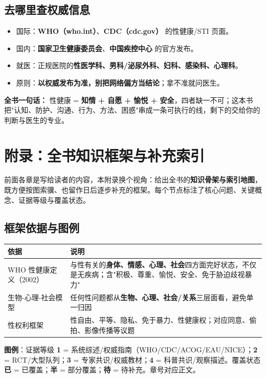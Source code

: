 \section{去哪里查权威信息}

\begin{itemize}[leftmargin=2em,itemsep=0.3em]
  \item 国际：\textbf{WHO（who.int）}、\textbf{CDC（cdc.gov）} 的性健康/STI 页面。
  \item 国内：\textbf{国家卫生健康委员会}、\textbf{中国疾控中心} 的官方发布。
  \item 就医：正规医院的\textbf{性医学科、男科/泌尿外科、妇科、感染科、心理科}。
  \item 原则：\textbf{以权威发布为准，别把网络偏方当结论}；拿不准就问医生。
\end{itemize}

\vspace{1em}
\noindent\textbf{全书一句话：} 性健康 = \textbf{知情 + 自愿 + 愉悦 + 安全}，四者缺一不可；这本书把"认知、防护、沟通、行为、方法、困惑"串成一条可执行的线，剩下的交给你的判断与医生的专业。

\chapter{附录：全书知识框架与补充索引}

前面各章是写给读者的内容，本附录换个视角：给出全书的\textbf{知识骨架与索引地图}，既方便按图索骥、也留作日后逐步补充的框架。每个节点标注了核心问题、关键概念、证据等级与覆盖状态。

\section{框架依据与图例}

\begin{tabularx}{\linewidth}{X X}
\toprule
\textbf{依据} & \textbf{说明} \\
\midrule
WHO 性健康定义（2002） & 与性有关的\textbf{身体、情感、心理、社会}四方面完好状态，不仅是无疾病；含"积极、尊重、愉悦、安全、免于胁迫歧视暴力" \\
生物-心理-社会模型 & 任何性问题都从\textbf{生物、心理、社会/关系}三层面看，避免单一归因 \\
性权利框架 & 性自由、平等、隐私、免于暴力、性健康权；对应同意、偷拍、影像传播等议题 \\
\bottomrule
\end{tabularx}

\vspace{0.5em}
\noindent\textbf{图例}：证据等级 \textbf{1} = 系统综述/权威指南（WHO/CDC/ACOG/EAU/NICE）；\textbf{2} = RCT/大型队列；\textbf{3} = 专家共识/权威教材；\textbf{4} = 科普共识/观察描述。覆盖状态 \textbf{已} = 已覆盖；\textbf{半} = 部分覆盖；\textbf{待} = 待补充。章号对应正文。

